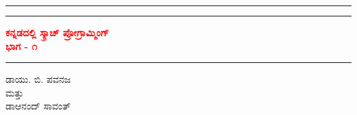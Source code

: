 \begin{titlepage} %
	
	\centering %
	
	
	\rule{\textwidth}{1pt} %
	
	\vspace{2pt}\vspace{-\baselineskip} %
	
	\rule{\textwidth}{0.4pt} %
	
	\vspace{0.1\textheight} %
	
\begin{center}	
	\textcolor{red}{ %
		{\Huge\textbf{ಕನ್ನಡದಲ್ಲಿ ಸ್ಕ್ರಾಚ್ ಪ್ರೋಗ್ರಾಮ್ಮಿಂಗ್\\ಭಾಗ - ೧}
	}
}
\end{center}
	\vspace{0.025\textheight} %
	
	\rule{0.3\textwidth}{0.4pt} %
	
	\vspace{0.1\textheight} %
	
	\begin{center}
	{\Large \textsc{ಡಾ\hspace{0.3mm}\vline\hspace{0.5mm}\vline \hspace{1mm}ಯು. ಬಿ. ಪವನಜ}}\\
	ಮತ್ತು\\
	{\Large \textsc{ಡಾ\hspace{0.3mm}\vline\hspace{0.5mm}\vline \hspace{1mm}ಆನಂದ್ ಸಾವಂತ್}} %
	\end{center}
	

\end{titlepage}
